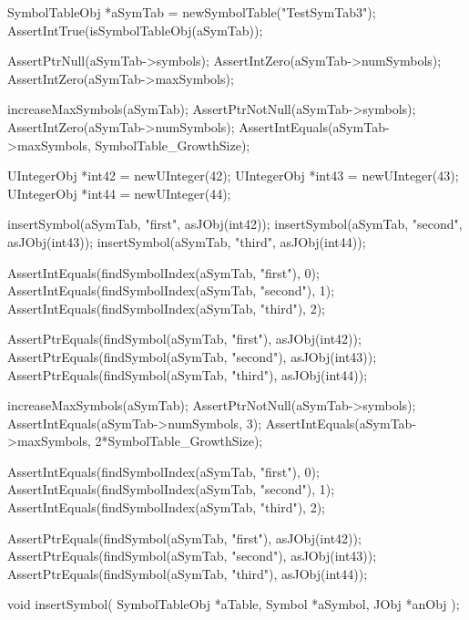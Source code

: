 
\startCTest
  SymbolTableObj *aSymTab = newSymbolTable("TestSymTab3");
  AssertIntTrue(isSymbolTableObj(aSymTab));
  
  AssertPtrNull(aSymTab->symbols);
  AssertIntZero(aSymTab->numSymbols);
  AssertIntZero(aSymTab->maxSymbols);
  
  increaseMaxSymbols(aSymTab);
  AssertPtrNotNull(aSymTab->symbols);
  AssertIntZero(aSymTab->numSymbols);
  AssertIntEquals(aSymTab->maxSymbols, SymbolTable_GrowthSize);

  UIntegerObj *int42 = newUInteger(42);
  UIntegerObj *int43 = newUInteger(43);
  UIntegerObj *int44 = newUInteger(44);
  
  insertSymbol(aSymTab, "first",  asJObj(int42));
  insertSymbol(aSymTab, "second", asJObj(int43));
  insertSymbol(aSymTab, "third",  asJObj(int44));
  
  AssertIntEquals(findSymbolIndex(aSymTab, "first"),  0);
  AssertIntEquals(findSymbolIndex(aSymTab, "second"), 1);
  AssertIntEquals(findSymbolIndex(aSymTab, "third"),  2);

  AssertPtrEquals(findSymbol(aSymTab, "first"),  asJObj(int42));
  AssertPtrEquals(findSymbol(aSymTab, "second"), asJObj(int43));
  AssertPtrEquals(findSymbol(aSymTab, "third"),  asJObj(int44));

  increaseMaxSymbols(aSymTab);
  AssertPtrNotNull(aSymTab->symbols);
  AssertIntEquals(aSymTab->numSymbols, 3);
  AssertIntEquals(aSymTab->maxSymbols, 2*SymbolTable_GrowthSize);

  AssertIntEquals(findSymbolIndex(aSymTab, "first"),  0);
  AssertIntEquals(findSymbolIndex(aSymTab, "second"), 1);
  AssertIntEquals(findSymbolIndex(aSymTab, "third"),  2);

  AssertPtrEquals(findSymbol(aSymTab, "first"),  asJObj(int42));
  AssertPtrEquals(findSymbol(aSymTab, "second"), asJObj(int43));
  AssertPtrEquals(findSymbol(aSymTab, "third"),  asJObj(int44));
\stopCTest
\stopTestCase
\stopTestSuite

\startTestSuite[insertSymbol]

\startCHeader
void insertSymbol(
  SymbolTableObj *aTable,
  Symbol         *aSymbol,
  JObj *anObj
);
\stopCHeader

